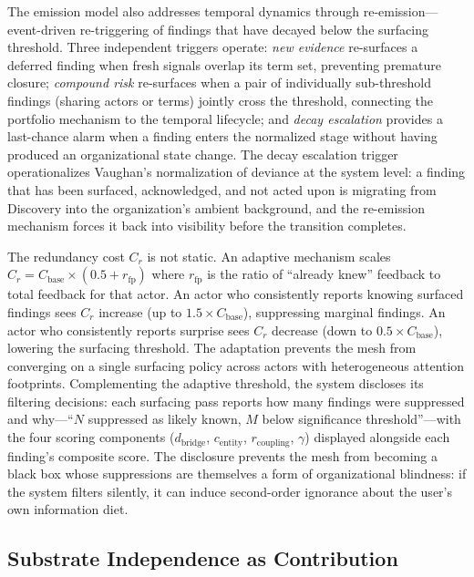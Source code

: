 \documentclass[11pt,a4paper]{article}
\begin{document}
The emission model also addresses temporal dynamics through re-emission---event-driven re-triggering of findings that have decayed below the surfacing threshold. Three independent triggers operate: \emph{new evidence} re-surfaces a deferred finding when fresh signals overlap its term set, preventing premature closure; \emph{compound risk} re-surfaces when a pair of individually sub-threshold findings (sharing actors or terms) jointly cross the threshold, connecting the portfolio mechanism to the temporal lifecycle; and \emph{decay escalation} provides a last-chance alarm when a finding enters the normalized stage without having produced an organizational state change. The decay escalation trigger operationalizes Vaughan's normalization of deviance at the system level: a finding that has been surfaced, acknowledged, and not acted upon is migrating from Discovery into the organization's ambient background, and the re-emission mechanism forces it back into visibility before the transition completes.

The redundancy cost $C_r$ is not static. An adaptive mechanism scales $C_r = C_{\text{base}} \times (0.5 + r_{\text{fp}})$ where $r_{\text{fp}}$ is the ratio of ``already knew'' feedback to total feedback for that actor. An actor who consistently reports knowing surfaced findings sees $C_r$ increase (up to $1.5 \times C_{\text{base}}$), suppressing marginal findings. An actor who consistently reports surprise sees $C_r$ decrease (down to $0.5 \times C_{\text{base}}$), lowering the surfacing threshold. The adaptation prevents the mesh from converging on a single surfacing policy across actors with heterogeneous attention footprints. Complementing the adaptive threshold, the system discloses its filtering decisions: each surfacing pass reports how many findings were suppressed and why---``$N$ suppressed as likely known, $M$ below significance threshold''---with the four scoring components ($d_{\text{bridge}}$, $c_{\text{entity}}$, $r_{\text{coupling}}$, $\gamma$) displayed alongside each finding's composite score. The disclosure prevents the mesh from becoming a black box whose suppressions are themselves a form of organizational blindness: if the system filters silently, it can induce second-order ignorance about the user's own information diet.


\subsection{Substrate Independence as Contribution}
\label{sec:substrate}
\end{document}
